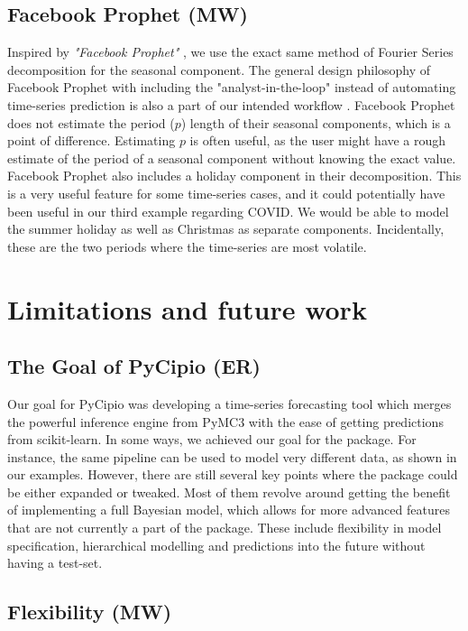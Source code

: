 \documentclass{article}
\begin{document}
\subsection{Facebook Prophet (MW)}

\noindent Inspired by \textit{"Facebook Prophet"} \cite{taylor2018forecasting}, we use the exact same method of Fourier Series decomposition for the seasonal component. The general design philosophy of Facebook Prophet with including the "analyst-in-the-loop" instead of automating time-series prediction is also a part of our intended workflow \cite{taylor2018forecasting}. 
Facebook Prophet does not estimate the period ($p$) length of their seasonal components, which is a point of difference. Estimating $p$ is often useful, as the user might have a rough estimate of the period of a seasonal component without knowing the exact value. Facebook Prophet also includes a holiday component in their decomposition. This is a very useful feature for some time-series cases, and it could potentially have been useful in our third example regarding COVID. We would be able to model the summer holiday as well as Christmas as separate components. Incidentally, these are the two periods where the time-series are most volatile.

\section{Limitations and future work}

\subsection{The Goal of PyCipio (ER)}

\noindent Our goal for PyCipio was developing a time-series forecasting tool which merges the powerful inference engine from PyMC3 with the ease of getting predictions from scikit-learn. In some ways, we achieved our goal for the package. For instance, the same pipeline can be used to model very different data, as shown in our examples. However, there are still several key points where the package could be either expanded or tweaked. Most of them revolve around getting the benefit of implementing a full Bayesian model, which allows for more advanced features that are not currently a part of the package. These include flexibility in model specification, hierarchical modelling and predictions into the future without having a test-set. 

\subsection{Flexibility (MW)}
\end{document}
